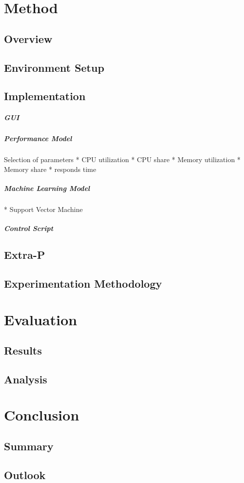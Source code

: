 \documentclass[
	ngerman,
	ruledheaders=section,%
	class=report,%
	thesis={type=master},%
	accentcolor=8c,%
	custommargins=false,%
	marginpar=false,%
	parskip=half-,%
	fontsize=11pt,%
]{tudapub}
\begin{document}
\chapter{Method}
\section{Overview}
\section{Environment Setup}
\section{Implementation}
\paragraph{GUI}
\paragraph{Performance Model}
Selection of parameters
* CPU utilization
* CPU share
* Memory utilization
* Memory share
* responds time
\paragraph{Machine Learning Model}
* Support Vector Machine
\paragraph{Control Script}
\section{Extra-P}
\section{Experimentation Methodology}
\newpage
\chapter{Evaluation}
\section{Results}
\section{Analysis}
\newpage
\chapter{Conclusion}
\section{Summary}
\section{Outlook}
\newpage
\renewcommand{\bibname}{References}
\printbibliography
\end{document}
